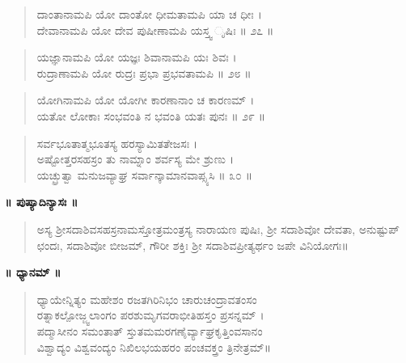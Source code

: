 \begin{verse}
ದಾಂತಾನಾಮಪಿ ಯೋ ದಾಂತೋ ಧೀಮತಾಮಪಿ ಯಾ ಚ ಧೀಃ ।\\ದೇವಾನಾಮಪಿ ಯೋ ದೇವ ಪುಷೀಣಾಮಪಿ ಯಸ್ತ್ವ ೃಷಿಃ \num{॥ ೨೭ ॥}
\end{verse}

\begin{verse}
ಯಜ್ಞಾನಾಮಪಿ ಯೋ ಯಜ್ಞಃ ಶಿವಾನಾಮಪಿ ಯಃ ಶಿವಃ ।\\ರುದ್ರಾಣಾಮಪಿ ಯೋ ರುದ್ರಃ ಪ್ರಭಾ ಪ್ರಭವತಾಮಪಿ \num{॥ ೨೮ ॥}
\end{verse}

\begin{verse}
ಯೋಗಿನಾಮಪಿ ಯೋ ಯೋಗೀ ಕಾರಣಾನಾಂ ಚ ಕಾರಣಮ್ ।\\ಯತೋ ಲೋಕಾಃ ಸಂಭವಂತಿ ನ ಭವಂತಿ ಯತಃ ಪುನಃ \num{॥ ೨೯ ॥}
\end{verse}

\begin{verse}
ಸರ್ವಭೂತಾತ್ಮಭೂತಸ್ಯ ಹರಸ್ಯಾಮಿತತೇಜಸಃ ।\\ಅಷ್ಟೋತ್ತರಸಹಸ್ರಂ ತು ನಾಮ್ನಾಂ ಶರ್ವಸ್ಯ ಮೇ ಶ್ರುಣು ।\\ಯಚ್ಛ್ರುತ್ವಾ ಮನುಜವ್ಯಾಘ್ರ ಸರ್ವಾನ್ಕಾಮಾನವಾಪ್ಸ್ಯಸಿ \num{॥ ೩೦ ॥}
\end{verse}

\begin{center}
\textbf{॥ ಪುಷ್ಯಾದಿನ್ಯಾಸಃ ॥}
\end{center}

\begin{verse}
ಅಸ್ಯ ಶ್ರೀಸದಾಶಿವಸಹಸ್ರನಾಮಸ್ತೋತ್ರಮಂತ್ರಸ್ಯ ನಾರಾಯಣ ಪುಷಿಃ, ಶ್ರೀ ಸದಾಶಿವೋ ದೇವತಾ, ಅನುಷ್ಟುಪ್ ಛಂದಃ, ಸದಾಶಿವೋ ಬೀಜಮ್, ಗೌರೀ ಶಕ್ತಿಃ ಶ್ರೀ ಸದಾಶಿವಪ್ರೀತ್ಯರ್ಥಂ ಜಪೇ ವಿನಿಯೋಗಃ॥
\end{verse}

\begin{center}
\textbf{॥ ಧ್ಯಾನಮ್ ॥}
\end{center}

\begin{verse}
ಧ್ಯಾಯೇನ್ನಿತ್ಯಂ ಮಹೇಶಂ ರಜತಗಿರಿನಿಭಂ ಚಾರುಚಂದ್ರಾವತಂಸಂ\\ರತ್ನಾಕಲ್ಪೋಜ್ಜ್ವಲಾಂಗಂ ಪರಶುಮೃಗವರಾಭೀತಿಹಸ್ತಂ ಪ್ರಸನ್ನಮ್ ।\\ಪದ್ಮಾಸೀನಂ ಸಮಂತಾತ್ ಸ್ತುತಮಮರಗಣೈರ್ವ್ಯಾಘ್ರಕೃತ್ತಿಂವಸಾನಂ\\ವಿಶ್ವಾದ್ಯಂ ವಿಶ್ವವಂದ್ಯಂ ನಿಖಿಲಭಯಹರಂ ಪಂಚವಕ್ತ್ರಂ ತ್ರಿನೇತ್ರಮ್​॥
\end{verse}

